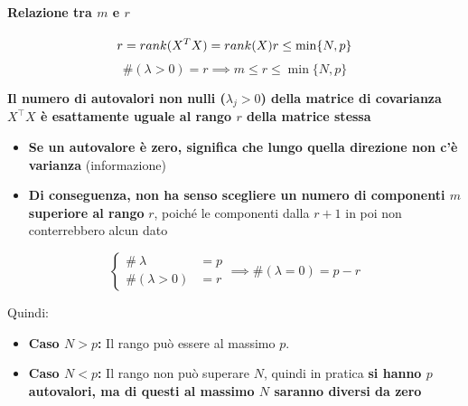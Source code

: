 	\paragraph{Relazione tra $m$ e $r$}
		\begin{mybox}
			$$
			r=rank(X^TX)=rank(X)\\ r \le \min\{N, p\}
			$$
			$$
			\#(\lambda>0)=r\implies m\le r\le \min\{N, p\}
			$$
			
			\textbf{Il numero di autovalori non nulli ($\lambda_j > 0$) della matrice di covarianza $X^\top X$ è esattamente uguale al rango $r$ della matrice stessa}
			
			\begin{itemize}[itemsep=3pt, topsep=3pt]
			  \item \textbf{Se un autovalore è zero, significa che lungo quella direzione non c'è varianza} (informazione)
			  \item \textbf{Di conseguenza, non ha senso scegliere un numero di componenti $m$ superiore al rango} $r$, poiché le componenti dalla $r+1$ in poi non conterrebbero alcun dato
			\end{itemize}
			$$
			\begin{cases}
				\#\ \lambda&=p\\
				\#(\lambda>0)&=r
			\end{cases}\implies
			\#(\lambda=0)=p-r
			$$
		\end{mybox}
		Quindi:
		\begin{itemize}[noitemsep, topsep=3pt]
		  \item \textbf{Caso $N > p$:} Il rango può essere al massimo $p$.
		  \item \textbf{Caso $N < p$:} Il rango non può superare $N$, quindi in pratica \textbf{si hanno $p$ autovalori, ma di questi al massimo $N$ saranno diversi da zero}
		\end{itemize}